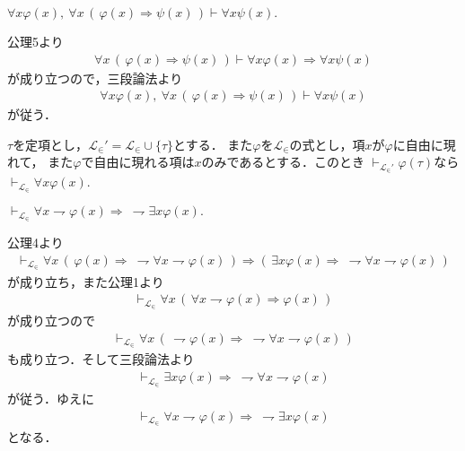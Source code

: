 	\begin{screen}
		$\forall x \varphi(x),\ \forall x\, (\, \varphi(x) \Longrightarrow \psi(x)\, )
		\vdash \forall x \psi(x).$
	\end{screen}
	
	公理5より
	\begin{align}
		\forall x\, (\, \varphi(x) \Longrightarrow \psi(x)\, )
		\vdash \forall x \varphi(x) \Longrightarrow \forall x \psi(x)
	\end{align}
	が成り立つので，三段論法より
	\begin{align}
		\forall x \varphi(x),\ \forall x\, (\, \varphi(x) \Longrightarrow \psi(x)\, )
		\vdash \forall x \psi(x)
	\end{align}
	が従う．
	
	\begin{screen}
		$\tau$を定項とし，$\mathcal{L}_{\in}' = \mathcal{L}_{\in} \cup \{\tau\}$とする．
		また$\varphi$を$\mathcal{L}_{\in}$の式とし，項$x$が$\varphi$に自由に現れて，
		また$\varphi$で自由に現れる項は$x$のみであるとする．このとき
		$\vdash_{\mathcal{L}_{\in}'} \varphi(\tau)$なら
		$\vdash_{\mathcal{L}_{\in}} \forall x \varphi(x)$.
	\end{screen}
	
	\begin{screen}
		\begin{logicalthm}[De Morgan 1]
			$\vdash_{\mathcal{L}_{\in}} \forall x \rightharpoondown \varphi(x) 
			\Longrightarrow\ \rightharpoondown \exists x \varphi(x).$
		\end{logicalthm}
	\end{screen}
	
	公理4より
	\begin{align}
		\vdash_{\mathcal{L}_{\in}} \forall x\, (\, \varphi(x) \Longrightarrow\ 
		\rightharpoondown \forall x \rightharpoondown \varphi(x)\, )
		\Longrightarrow (\, \exists x \varphi(x)
		\Longrightarrow\ \rightharpoondown \forall x \rightharpoondown \varphi(x)\, )
	\end{align}
	が成り立ち，また公理1より
	\begin{align}
		\vdash_{\mathcal{L}_{\in}}
		\forall x\, (\, \forall x \rightharpoondown \varphi(x)
		\Longrightarrow \varphi(x)\, )
	\end{align}
	が成り立つので
	\begin{align}
		\vdash_{\mathcal{L}_{\in}}
		\forall x\, (\, \rightharpoondown \varphi(x)
		\Longrightarrow\ \rightharpoondown \forall x \rightharpoondown \varphi(x)\, )
	\end{align}
	も成り立つ．そして三段論法より
	\begin{align}
		\vdash_{\mathcal{L}_{\in}} \exists x \varphi(x)
		\Longrightarrow\ \rightharpoondown \forall x \rightharpoondown \varphi(x)
	\end{align}
	が従う．ゆえに
	\begin{align}
		\vdash_{\mathcal{L}_{\in}} \forall x \rightharpoondown \varphi(x) 
		\Longrightarrow\ \rightharpoondown \exists x \varphi(x)
	\end{align}
	となる．
	
